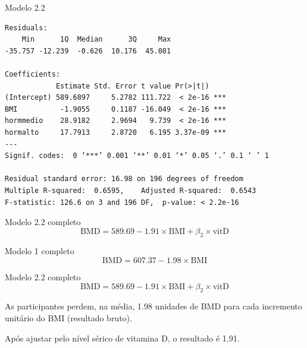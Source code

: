 \documentclass{beamer}
\begin{document}
\begin{frame}[fragile]{\scriptsize }
  \begin{center}
    \begin{exampleblock}{Modelo 2.2}
      \tiny
\begin{verbatim}
Residuals:
    Min      1Q  Median      3Q     Max 
-35.757 -12.239  -0.626  10.176  45.081 

Coefficients:
            Estimate Std. Error t value Pr(>|t|)    
(Intercept) 589.6897     5.2782 111.722  < 2e-16 ***
BMI          -1.9055     0.1187 -16.049  < 2e-16 ***
hormmedio    28.9182     2.9694   9.739  < 2e-16 ***
hormalto     17.7913     2.8720   6.195 3.37e-09 ***
---
Signif. codes:  0 ‘***’ 0.001 ‘**’ 0.01 ‘*’ 0.05 ‘.’ 0.1 ‘ ’ 1

Residual standard error: 16.98 on 196 degrees of freedom
Multiple R-squared:  0.6595,	Adjusted R-squared:  0.6543 
F-statistic: 126.6 on 3 and 196 DF,  p-value: < 2.2e-16
\end{verbatim}
    \end{exampleblock}
  \begin{exampleblock}{Modelo 2.2 completo}
    \scriptsize
    \begin{displaymath}
      \text{BMD} =589.69 -1.91 \times\text{BMI} + \beta_2 \times\text{vitD}
    \end{displaymath}
  \end{exampleblock}
  \end{center}
\end{frame}

\begin{frame}{\scriptsize }
  \begin{exampleblock}{Modelo 1 completo}
    \tiny
    \begin{displaymath}
      \text{BMD} =607.37 -1.98 \times\text{BMI}
    \end{displaymath}
  \end{exampleblock}
  \begin{exampleblock}{Modelo 2.2 completo}
    \scriptsize
    \begin{displaymath}
      \text{BMD} =589.69 -1.91 \times\text{BMI} + \beta_2 \times\text{vitD}
    \end{displaymath}
  \end{exampleblock}
  \begin{block}{}
    \footnotesize
    As participantes perdem, na média, 1.98 unidades de BMD para cada incremento unitário do BMI (resultado bruto).

    \bigskip
    Após ajustar pelo nível sérico de vitamina D, o resultado é 1.91.
  \end{block}
\end{frame}
\end{document}
